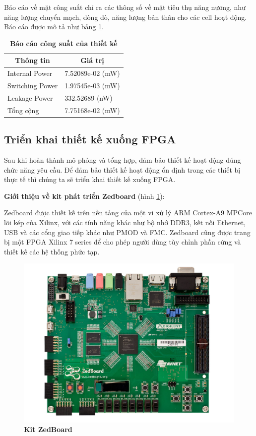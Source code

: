 Báo cáo về mặt công suất chỉ ra các thông số về mặt tiêu thụ năng nương, như năng 
lượng chuyển mạch, dòng dò, năng lượng bản thân cho các cell hoạt động. Báo cáo được mô tả như bảng \ref{syn_power}.
\begin{table}[H]
\centering
\caption[Báo cáo công suất của thiết kế]{\bfseries \fontsize{12pt}{0pt}\selectfont Báo cáo công suất của thiết kế}
\begin{tabular}{|l|l|}
\hline
\multicolumn{1}{|c|}{\textbf{Thông tin}} & \multicolumn{1}{c|}{\textbf{Giá trị}} \\ \hline
Internal Power & 7.52089e-02 (mW) \\ \hline
Switching Power & 1.97545e-03 (mW) \\ \hline
Leakage Power & 332.52689 (nW) \\ \hline
Tổng cộng & 7.75168e-02 (mW) \\ \hline
\end{tabular}
\label{syn_power}
\end{table}
\subsection{Triển khai thiết kế xuống FPGA}
Sau khi hoàn thành mô phỏng và tổng hợp, đảm bảo thiết kế hoạt động đúng chức 
năng yêu cầu. Để đảm bảo thiết kế hoạt động ổn định trong các thiết bị thực tế thì chúng ta sẽ triển khai thiết kế xuống FPGA.

\textbf{Giới thiệu về kit phát triển Zedboard} (hình \ref{zedboard}):

Zedboard được thiết kế trên nền tảng của một vi xử lý ARM Cortex-A9 MPCore lõi kép của Xilinx, với các tính năng khác như bộ nhớ DDR3, kết nối Ethernet, USB và các cổng giao tiếp khác như PMOD và FMC. Zedboard cũng được trang bị một FPGA Xilinx 7 series để cho phép người dùng tùy chỉnh phần cứng và thiết kế các hệ thống phức tạp.

\begin{figure}[H]
    \centering
    \includegraphics[width=12cm]{Images/Chuong5/fpga/zedboard.jpg}
    \caption[Kit ZedBoard]{\bfseries \fontsize{12pt}{0pt}\selectfont Kit ZedBoard}
    \label{zedboard}
\end{figure}

